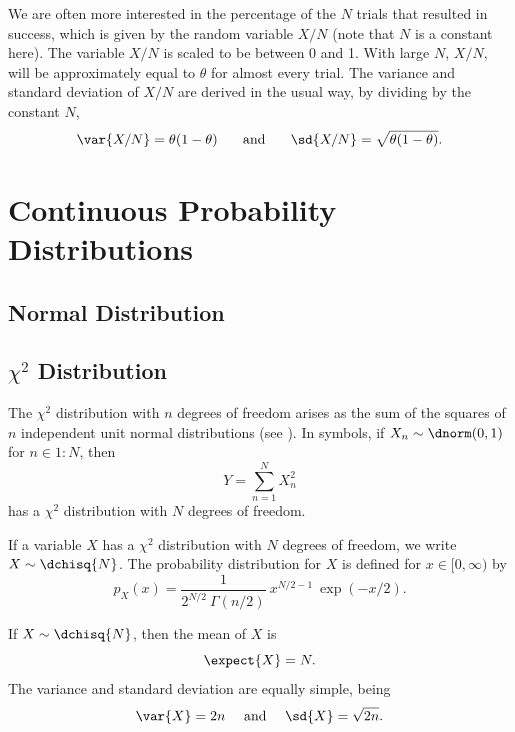 We are often more interested in the percentage of the $N$ trials that
resulted in success, which is given by the random variable $X/N$ (note
that $N$ is a constant here).  The variable $X/N$ is scaled to be
between 0 and 1.  With large $N$, $X/N$, will be approximately equal
to $\theta$ for almost every trial.  The variance and standard
deviation of $X/N$ are derived in the usual way, by dividing by the
constant $N$,
%
\begin{equation}
\var{X/N} = \theta (1 - \theta) 
\hspace*{0.25in}
\mbox{and}
\hspace*{0.25in}
\sd{X/N} = \sqrt{\theta (1-\theta)}.
\end{equation}



\section{Continuous Probability Distributions}

\subsection{Normal Distribution}\label{section:stats-normal-distribution}



\subsection{$\chi^2$ Distribution}\label{section:stats-chi-squared-distribution}

The $\chi^2$ distribution with $n$ degrees of freedom arises as the
sum of the squares of $n$ independent unit normal distributions (see
).  In symbols, if $X_n \sim \dnorm(0,1)$
for $n \in 1{:}N$, then 
%
\begin{equation}
Y = \sum_{n=1}^N X_n^2
\end{equation}
%
has a $\chi^2$ distribution with $N$ degrees of freedom.

If a variable $X$ has a $\chi^2$ distribution with $N$ degrees of
freedom, we write $X \sim \dchisq{N}$.  The probability distribution
for $X$ is defined for $x \in [0,\infty)$ by
%
\begin{equation}
p_X(x) = \frac{1}{2^{N/2} \ \Gamma(n/2)} \ x^{N/2-1} \ \exp(-x/2).
\end{equation}
%

If $X \sim \dchisq{N}$, then the mean of $X$ is
%
\begin{equation}
\expect{X} = N.
\end{equation}
%
The variance and standard deviation are equally simple, being
%
\begin{equation}
\var{X} = 2n \ \ \ \ \mbox{and} \ \ \ \  \sd{X} = \sqrt{2n}.
\end{equation}

